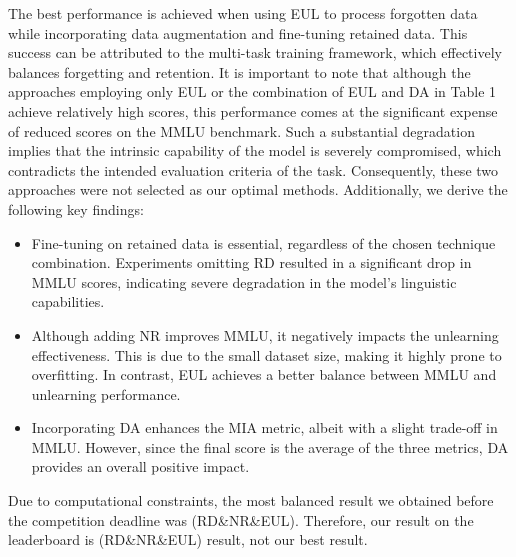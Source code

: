 \documentclass[11pt]{article}
\begin{document}
The best performance is achieved when using EUL to process forgotten data while incorporating data augmentation and fine-tuning retained data. This success can be attributed to the multi-task training framework, which effectively balances forgetting and retention.
It is important to note that although the approaches employing only EUL or the combination of EUL and DA in Table 1 achieve relatively high scores, this performance comes at the significant expense of reduced scores on the MMLU benchmark. Such a substantial degradation implies that the intrinsic capability of the model is severely compromised, which contradicts the intended evaluation criteria of the task. Consequently, these two approaches were not selected as our optimal methods.
Additionally, we derive the following key findings:
\begin{itemize}
	\item Fine-tuning on retained data is essential, regardless of the chosen technique combination. Experiments omitting RD resulted in a significant drop in MMLU scores, indicating severe degradation in the model’s linguistic capabilities.
	\item Although adding NR improves MMLU, it negatively impacts the unlearning effectiveness. This is due to the small dataset size, making it highly prone to overfitting. In contrast, EUL achieves a better balance between MMLU and unlearning performance.
	\item Incorporating DA enhances the MIA metric, albeit with a slight trade-off in MMLU. However, since the final score is the average of the three metrics, DA provides an overall positive impact.
\end{itemize}


Due to computational constraints, the most balanced result we obtained before the competition deadline was (RD\&NR\&EUL). Therefore, our result on the leaderboard is (RD\&NR\&EUL) result, not our best result.
\end{document}
